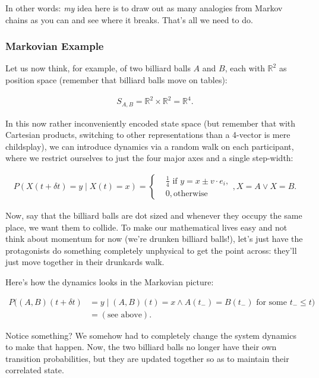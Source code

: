 \documentclass{article}
\begin{document}
In other words: \textit{my} idea here is to draw out as many analogies from Markov chains as you can and see where it breaks. That's all we need to do.

\subsubsection{Markovian Example}

Let us now think, for example, of two billiard balls $A$ and $B$, each with $\mathbb{R}^2$ as position space (remember that billiard balls move on tables):

\begin{align*}
S_{A,B} = \mathbb{R}^2\times\mathbb{R}^2 = \mathbb{R}^4.
\end{align*}

In this now rather inconveniently encoded state space (but remember that with Cartesian products, switching to other representations than a 4-vector is mere childsplay), we can introduce dynamics via a random walk on each participant, where we restrict ourselves to just the four major axes and a single step-width:

\begin{align*}
P(X(t+\delta t) = y \mid X(t) = x) = \begin{cases}
&\frac{1}{4} \text{ if } y = x\pm v\cdot e_i,\\
&0, \text{otherwise}
\end{cases}, X=A\lor X=B. 
\end{align*}

Now, say that the billiard balls are dot sized and whenever they occupy the same place, we want them to collide. To make our mathematical lives easy and not think about momentum for now (we're drunken billiard balls!), let's just have the protagonists do something completely unphysical to get the point across: they'll just move together in their drunkards walk.

Here's how the dynamics looks in the Markovian picture:

\begin{align*}
P((A,B)(t+\delta t) &= y \mid (A,B)(t)=x \land A(t_-) = B(t_-) \text{ for some } t_- \leq t) \\
&= (\text{see above}).
\end{align*}

Notice something? We somehow had to completely change the system dynamics to make that happen. Now, the two billiard balls no longer have their own transition probabilities, but they are updated together so as to maintain their correlated state.
\end{document}
